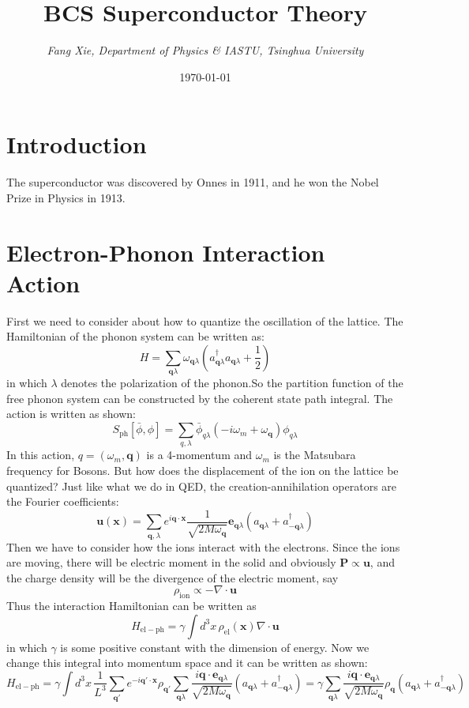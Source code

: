 \documentclass{article}
\author{\emph{Fang Xie, Department of Physics \& IASTU, Tsinghua University}}
\title{{\bf{BCS Superconductor Theory}}}
\date{\today}
\newcommand{\mtq}{\mathbf{q}}
\begin{document}
\maketitle
\section{Introduction}
The superconductor was discovered by Onnes in 1911, and he won the Nobel Prize in Physics in 1913. 
\section{Electron-Phonon Interaction Action}
First we need to consider about how to quantize the oscillation of the lattice. The Hamiltonian of the phonon system can be written as:
$$
H = \sum_{\mtq \lambda} \omega_{\mtq\lambda} \left(a^\dagger_{\mtq\lambda}a_{\mtq\lambda}+\frac{1}{2}\right)
$$
in which $\lambda$ denotes the polarization of the phonon.So the partition function of the free phonon system can be constructed by the coherent state path integral. The action is written as shown:
\begin{equation}
S_{\mathrm{ph}}[\bar{\phi},\phi] = \sum_{q,\lambda}\bar{\phi}_{q\lambda}\left(-i\omega_m + \omega_\mtq\right)\phi_{q\lambda}
\end{equation}
In this action, $q = (\omega_m,\mtq)$ is a 4-momentum and $\omega_m$ is the Matsubara frequency for Bosons. But how does the displacement of the ion on the lattice be quantized? Just like what we do in QED, the creation-annihilation operators are the Fourier coefficients:
\begin{equation}
\mathbf{u}(\mathbf{x}) = \sum_{\mtq,\lambda}e^{i \mtq \cdot \mathbf{x}}\frac{1}{\sqrt{2M\omega_\mtq}}\mathbf{e}_{\mtq\lambda}(a_{\mtq\lambda}+a^\dagger_{-\mtq\lambda})
\end{equation}
Then we have to consider how the ions interact with the electrons. Since the ions are moving, there will be electric moment in the solid and obviously $\mathbf{P}\propto \mathbf{u}$, and the charge density will be the divergence of the electric moment, say
$$
\rho_{\mathrm{ion}} \propto -\nabla \cdot \mathbf{u}
$$ 
Thus the interaction Hamiltonian can be written as
$$
H_{\mathrm{el-ph}} = \gamma \int d^3x \,\rho_{\mathrm{el}}(\mathbf{x}) \nabla\cdot\mathbf{u}
$$
in which $\gamma$ is some positive constant with the dimension of energy. Now we change this integral into momentum space and it can be written as shown:
\begin{equation}
H_{\mathrm{el-ph}} = \gamma\int d^3x\, \frac{1}{L^3} \sum_{\mtq'}e^{-i\mtq'\cdot\mathbf{x}}\rho_{\mtq'}\sum_{\mtq\lambda}\frac{i\mtq\cdot \mathbf{e}_{\mtq\lambda}}{\sqrt{2M\omega_{\mtq}}}(a_{\mtq\lambda}+ a^\dagger_{-\mtq\lambda}) = \gamma \sum_{\mtq\lambda}\frac{i\mtq\cdot\mathbf{e}_{\mtq\lambda}}{\sqrt{2M\omega_{\mtq}}}\rho_{\mtq}(a_{\mtq\lambda}+ a^\dagger_{-\mtq\lambda}) 
\end{equation}
\end{document}

